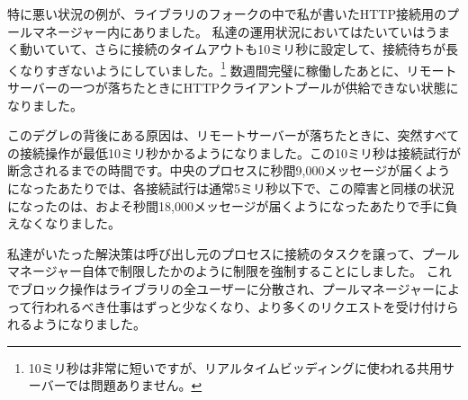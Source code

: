 特に悪い状況の例が、\href{https://github.com/ferd/lhttpc}{}ライブラリのフォークの中で私が書いたHTTP接続用のプールマネージャー内にありました。
私達の運用状況においてはたいていはうまく動いていて、さらに接続のタイムアウトも10ミリ秒に設定して、接続待ちが長くなりすぎないようにしていました。\footnote{10ミリ秒は非常に短いですが、リアルタイムビッディングに使われる共用サーバーでは問題ありません。}
数週間完璧に稼働したあとに、リモートサーバーの一つが落ちたときにHTTPクライアントプールが供給できない状態になりました。

このデグレの背後にある原因は、リモートサーバーが落ちたときに、突然すべての接続操作が最低10ミリ秒かかるようになりました。この10ミリ秒は接続試行が断念されるまでの時間です。中央のプロセスに秒間9,000メッセージが届くようになったあたりでは、各接続試行は通常5ミリ秒以下で、この障害と同様の状況になったのは、およそ秒間18,000メッセージが届くようになったあたりで手に負えなくなりました。

私達がいたった解決策は呼び出し元のプロセスに接続のタスクを譲って、プールマネージャー自体で制限したかのように制限を強制することにしました。
これでブロック操作はライブラリの全ユーザーに分散され、プールマネージャーによって行われるべき仕事はずっと少なくなり、より多くのリクエストを受け付けられるようになりました。

